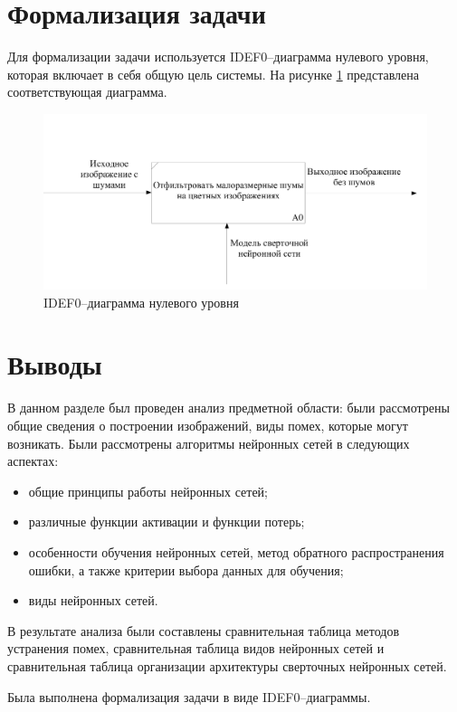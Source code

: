 \section{Формализация задачи}

Для формализации задачи используется IDEF0--диаграмма нулевого уровня, которая включает в себя общую цель системы. На рисунке \ref{fig:idef0_0} представлена соответствующая диаграмма.

\begin{figure}[h!btp]
	\centering
	\includegraphics[scale = 0.5]{inc/analysis/01_A0.png}
	\caption{IDEF0--диаграмма нулевого уровня}
	\label{fig:idef0_0}	
\end{figure}

\section{Выводы}

В данном разделе был проведен анализ предметной области: были рассмотрены общие сведения о построении изображений, виды помех, которые могут возникать. Были рассмотрены алгоритмы нейронных сетей в следующих аспектах:
\begin{itemize}
    \item общие принципы работы нейронных сетей;
    \item различные функции активации и функции потерь;
    \item особенности обучения нейронных сетей, метод обратного распространения ошибки, а также критерии выбора данных для обучения;
    \item виды нейронных сетей.
\end{itemize}

В результате анализа были составлены сравнительная таблица методов устранения помех, сравнительная таблица видов нейронных сетей и сравнительная таблица организации архитектуры сверточных нейронных сетей.

Была выполнена формализация задачи в виде IDEF0--диаграммы.